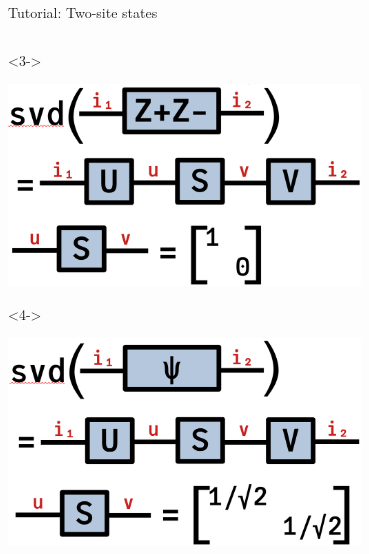 \begin{frame}[fragile]{Tutorial: Two-site states}
\begin{columns}
\begin{column}{5cm}

\begin{onlyenv}<3->
\vspace*{0.0cm}
\begin{center}
\includegraphics[width=0.7\textwidth]{
  slides/assets/svd_ZpZm12.png
}
\end{center}
\end{onlyenv}

\begin{onlyenv}<4->
\begin{center}
\includegraphics[width=0.7\textwidth]{
  slides/assets/svd_cat12.png
}
\end{center}
\vspace*{0.0cm}
\end{onlyenv}

\end{column}

\end{columns}

\end{frame}
